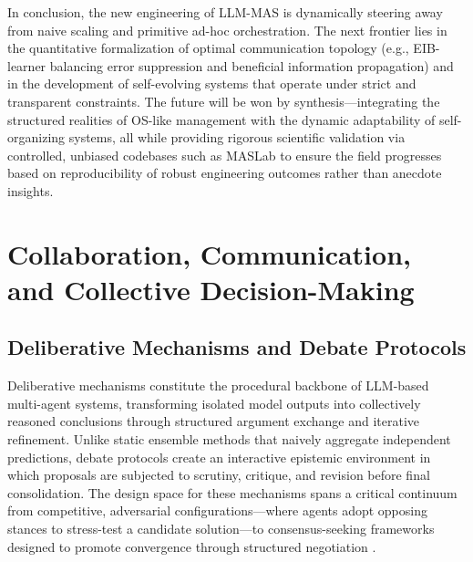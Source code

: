 \documentclass[11pt,a4paper]{article}
\begin{document}
In conclusion, the new engineering of LLM-MAS is dynamically steering away from naive scaling and primitive ad-hoc orchestration. The next frontier lies in the quantitative formalization of optimal communication topology (e.g., EIB-learner balancing error suppression and beneficial information propagation) \cite{arxiv:2505.23352v1} and in the development of self-evolving systems that operate under strict and transparent constraints. The future will be won by synthesis---integrating the structured realities of OS-like management with the dynamic adaptability of self-organizing systems, all while providing rigorous scientific validation via controlled, unbiased codebases such as MASLab to ensure the field progresses based on reproducibility of robust engineering outcomes rather than anecdote insights.


\section{Collaboration, Communication, and Collective Decision-Making}



\subsection{Deliberative Mechanisms and Debate Protocols}


Deliberative mechanisms constitute the procedural backbone of LLM-based multi-agent systems, transforming isolated model outputs into collectively reasoned conclusions through structured argument exchange and iterative refinement. Unlike static ensemble methods that naively aggregate independent predictions, debate protocols create an interactive epistemic environment in which proposals are subjected to scrutiny, critique, and revision before final consolidation. The design space for these mechanisms spans a critical continuum from competitive, adversarial configurations---where agents adopt opposing stances to stress-test a candidate solution---to consensus-seeking frameworks designed to promote convergence through structured negotiation \cite{arxiv:2306.03314v1,arxiv:2310.20151v2}.
\end{document}
